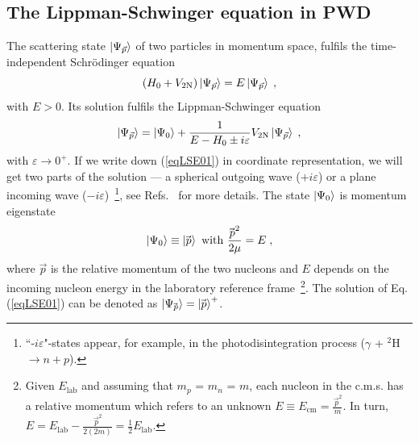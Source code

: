 \subsection{The Lippman-Schwinger equation in PWD}
The scattering state $\ket{\Psi_{\vec{p}}}$ of two particles in momentum space, fulfils the time-independent Schr{\"o}dinger equation
\begin{equation}
\left(H_{0} + V_{\mathrm{2N}}\right)\ket{\Psi_{\vec{p}}} = E\ket{\Psi_{\vec{p}}}\;,
\label{eqLSE}
\end{equation}
with $E > 0$. Its solution fulfils the Lippman-Schwinger equation
\begin{equation}
\ket{\Psi_{\vec{p}}} = \ket{\Psi_{0}} + \frac{1}{E - H_{0} \pm i\varepsilon}V_{\mathrm{2N}}\ket{\Psi_{\vec{p}}}\;,
\label{eqLSE01}
\end{equation}
with $\varepsilon \rightarrow 0^{+}$. If we write down (\ref{eqLSE01}) in coordinate representation, we will get two parts of the solution --- a spherical outgoing wave ($+i\varepsilon$) or a plane incoming wave ($-i\varepsilon$)~\footnote{``-$i\varepsilon$"-states appear, for example, in the photodisintegration process ($\gamma$ + $^{2}$H $\rightarrow n + p$).}, see Refs.~\cite{glockle1983quantum, ChElsterLecs} for more details. The state $\ket{\Psi_{0}}$ is momentum eigenstate 
\begin{equation}
\ket{\Psi_{0}} \equiv \ket{\!\vec{\,p}}~\mathrm{with}~\frac{\!\vec{\,p}^{2}}{2\mu} = E\;,
\end{equation}
where $\vec{p}$ is the relative momentum of the two nucleons and $E$ depends on the incoming nucleon energy in the laboratory reference frame~\footnote{Given $E_{\mathrm{lab}}$ and assuming that $m_{p}$ = $m_{n}$ = $m$, each nucleon in the c.m.s. has a relative momentum which refers to an unknown $E \equiv E_{\mathrm{cm}} = \frac{\!\vec{\, p}^{2}}{m}$. In turn, $E = E_{\mathrm{lab}} - \frac{\!\vec{\, p}^{2}}{2(2m)} = \frac{1}{2}E_{\mathrm{lab}}$.}. The solution of Eq. (\ref{eqLSE01}) can be denoted as $\ket{\Psi_{\!\vec{\,p}}}= \ket{\!\vec{\,p}}^{+}$.

